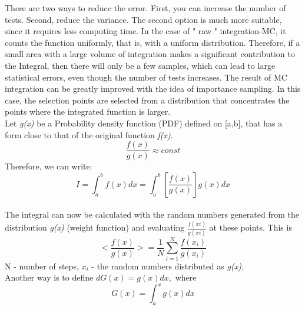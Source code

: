 \documentclass{article}
\begin{document}
There are two ways to reduce the error. First, you can increase the number of tests. Second, reduce the variance. The second option is much more suitable, since it requires less computing time. In the case of " raw " integration-MC, it counts the function uniformly, that is, with a uniform distribution. Therefore, if a small area with a large volume of integration makes a significant contribution to the Integral, then there will only be a few samples, which can lead to large statistical errors, even though the number of tests increases. The result of MC integration can be greatly improved with the idea of importance sampling. In this case, the selection points are selected from a distribution that concentrates the points where the integrated function is larger.\\

Let \textit{g(x)} be a Probability density function (PDF) defined on [a,b], that has a form close to that of the original function \textit{f(x)}. 
\newline
    \begin{equation}\label{eq:fourierrow}
        \frac{f(x)}{g(x)} \approx const
    \end{equation}
\newline
Therefore, we can write:
\newline
    \begin{equation}\label{eq:fourierrow}
        I = \int_{a}^{b}f(x)dx = \int_{a}^{b}[\frac{f(x)}{g(x)}]g(x)dx
    \end{equation}\\
    
The integral can now be calculated with the random numbers generated from the distribution \textit{g(x)} (weight function) and evaluating ${\frac{f(xi)}{g(xi)}}$ at these points. This is 
\newline
    \begin{equation}\label{eq:fourierrow}
        <\frac{f(x)}{g(x)}>=\frac{1}{N}\sum_{i=1}^{N}\frac{f(x_{i})}{g(x_{i})}
    \end{equation}
\newline
N - number of steps, ${x_{i}}$ - the random numbers distributed as \textit{g(x)}.\\

Another way is to define ${dG(x)=g(x)dx,}$ where 
\newline
    \begin{equation}\label{eq:fourierrow}
        G(x)=\int_{a}^{x}g(x)dx
    \end{equation}\\
\end{document}
